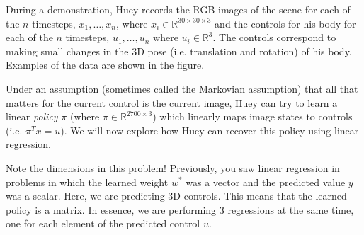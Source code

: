 \documentclass{article}
\begin{document}
During a demonstration, Huey records the RGB images of the scene for each of the $n$ timesteps, $x_{1}, \ldots, x_{n}$, where $x_{i} \in \mathbb{R}^{30 \times 30 \times 3}$ and the controls for his body for each of the $n$ timesteps, $u_{1}, \ldots, u_{n}$ where $u_{i} \in \mathbb{R}^{3}$. The controls correspond to making small changes in the $3$D pose (i.e. translation and rotation) of his body. Examples of the data are shown in the figure.

Under an assumption (sometimes called the Markovian assumption) that all that matters for the current control is the current image, Huey can try to learn a linear \textit{policy} $\pi$ (where $\pi \in \mathbb{R}^{2700 \times 3}$) which linearly maps image states to controls (i.e. $\pi^{T}x = u$). We will now explore how Huey can recover this policy using linear regression.

Note the dimensions in this problem! Previously, you saw linear regression in problems in which the learned weight $w^{*}$ was a vector and the predicted value $y$ was a scalar. Here, we are predicting $3$D controls. This means that the learned policy is a matrix. In essence, we are performing $3$ regressions at the same time, one for each element of the predicted control $u$.
\end{document}
